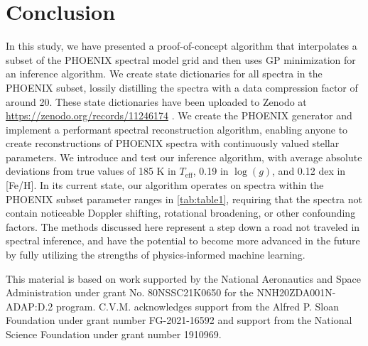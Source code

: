 \documentclass[twocolumn, linenumbers]{aastex631}
\begin{document}
\section{Conclusion}
In this study, we have presented a proof-of-concept algorithm that interpolates a subset of the PHOENIX spectral model grid and then uses GP minimization for an inference algorithm.
We create state dictionaries for all spectra in the PHOENIX subset, lossily distilling the spectra with a data compression factor of around 20. These state dictionaries have been uploaded to Zenodo at \url{https://zenodo.org/records/11246174} \citep{zenodo}.
We create the PHOENIX generator and implement a performant spectral reconstruction algorithm, enabling anyone to create reconstructions of PHOENIX spectra with continuously valued stellar parameters.
We introduce and test our inference algorithm, with average absolute deviations from true values of 185 K in $T_\mathrm{eff}$, 0.19 in $\log(g)$, and 0.12 dex in [Fe/H].
In its current state, our algorithm operates on spectra within the PHOENIX subset parameter ranges in \autoref{tab:table1}, requiring that the spectra not contain noticeable Doppler shifting, rotational broadening, or other confounding factors.
The methods discussed here represent a step down a road not traveled in spectral inference, and have the potential to become more advanced in the future by fully utilizing the strengths of physics-informed machine learning.

\vspace{0.5cm}
This material is based on work supported by the National Aeronautics and Space Administration under grant No. 80NSSC21K0650 for the NNH20ZDA001N-ADAP:D.2 program. C.V.M. acknowledges support from the Alfred P. Sloan Foundation under grant number FG-2021-16592 and support from the National Science Foundation under grant number 1910969.
\vspace{0.5cm}



\end{document}
